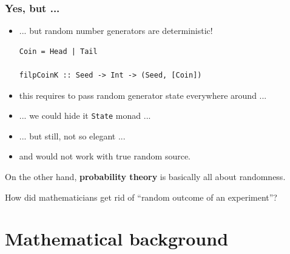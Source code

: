 \documentclass[mathserif, 8pt]{beamer}
\begin{document}
\begin{frame}[fragile]
  \frametitle{Yes, but ...}
  \begin{itemize}
  \item ... but random number generators are deterministic!

\begin{verbatim}
Coin = Head | Tail

filpCoinK :: Seed -> Int -> (Seed, [Coin])
\end{verbatim}

    \pause
  \item this requires to pass random generator state everywhere around ...
    \pause
  \item ... we could hide it \verb|State| monad ...
  \item ... but still, not so elegant ...
  \item and would not work with true random source.
  \end{itemize}

    \pause

  On the other hand, \textbf{probability theory} is basically
  all about randomness.

  \alert{How did mathematicians get rid of ``random outcome of an experiment''?}
\end{frame}

\section{Mathematical background}
\end{document}
